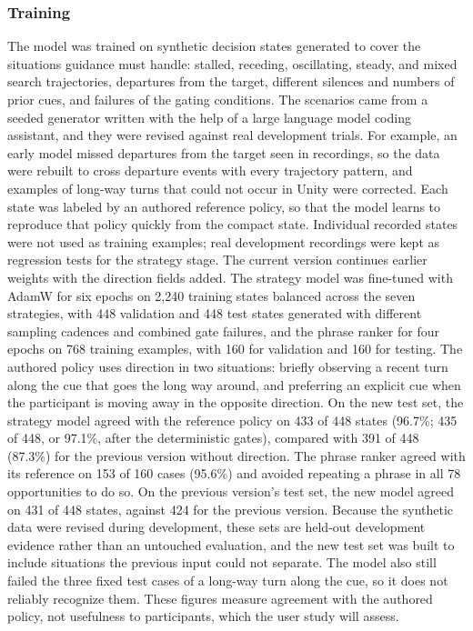 \subsubsection{Training}
\label{sec:model-training}
The model was trained on synthetic decision states generated to cover the situations guidance must handle: stalled, receding, oscillating, steady, and mixed search trajectories, departures from the target, different silences and numbers of prior cues, and failures of the gating conditions. The scenarios came from a seeded generator written with the help of a large language model coding assistant, and they were revised against real development trials. For example, an early model missed departures from the target seen in recordings, so the data were rebuilt to cross departure events with every trajectory pattern, and examples of long-way turns that could not occur in Unity were corrected. Each state was labeled by an authored reference policy, so that the model learns to reproduce that policy quickly from the compact state. Individual recorded states were not used as training examples; real development recordings were kept as regression tests for the strategy stage. The current version continues earlier weights with the direction fields added. The strategy model was fine-tuned with AdamW for six epochs on 2,240 training states balanced across the seven strategies, with 448 validation and 448 test states generated with different sampling cadences and combined gate failures, and the phrase ranker for four epochs on 768 training examples, with 160 for validation and 160 for testing. The authored policy uses direction in two situations: briefly observing a recent turn along the cue that goes the long way around, and preferring an explicit cue when the participant is moving away in the opposite direction. On the new test set, the strategy model agreed with the reference policy on 433 of 448 states (96.7\%; 435 of 448, or 97.1\%, after the deterministic gates), compared with 391 of 448 (87.3\%) for the previous version without direction. The phrase ranker agreed with its reference on 153 of 160 cases (95.6\%) and avoided repeating a phrase in all 78 opportunities to do so. On the previous version's test set, the new model agreed on 431 of 448 states, against 424 for the previous version. Because the synthetic data were revised during development, these sets are held-out development evidence rather than an untouched evaluation, and the new test set was built to include situations the previous input could not separate. The model also still failed the three fixed test cases of a long-way turn along the cue, so it does not reliably recognize them. These figures measure agreement with the authored policy, not usefulness to participants, which the user study will assess.

